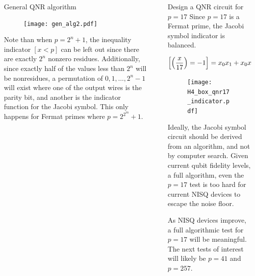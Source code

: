 \documentclass[final]{beamer}
\newlength{\sepwidth}
\newlength{\colwidth}
\newcommand{\separatorcolumn}{\begin{column}{\sepwidth}\end{column}}
\begin{document}
\begin{frame}[t]
\begin{columns}[t]
\begin{column}{\colwidth}
\begin{block}{General QNR algorithm}
    \begin{center}
    \begin{figure}
      \texttt{[image: gen\_alg2.pdf]}
    \end{figure}
    \end{center}

    Note than when $p=2^n+1$, the inequality indicator $[x<p]$ can be left out since there are exactly $2^n$ nonzero residues.
    Additionally, since exactly half of the values less than $2^n$ will be nonresidues, a permutation of $0,1,\ldots ,2^{n}-1$ will exist where one of the output wires is the parity bit, and another is the indicator function for the Jacobi symbol.
  This only happens for Fermat primes where $p=2^{2^m}+1$.
  \end{block}


\end{column}

\separatorcolumn

\begin{column}{\colwidth}

  \begin{block}{Design a QNR circuit for $p=17$}
    Since $p=17$ is a Fermat prime, the Jacobi symbol indicator is balanced.

 $$\left[\left( \displaystyle\frac{x}{17} \right)=-1\right]=x_0x_1+x_0x_2+x_1x_2+x_1x_3+x_2x_3+x_0x_1x_3$$

 \begin{center}
    \begin{figure}
      \texttt{[image: H4\_box\_qnr17\_indicator.pdf]}
    \end{figure}
 \end{center}

    Ideally, the Jacobi symbol circuit should be derived from an algorithm, and not by computer search.
    Given current qubit fidelity levels, a full algorithm, even the $p=17$ test is too hard for current NISQ devices to escape the noise floor.

    As NISQ devices improve, a full algorithmic test for $p=17$ will be meaningful.
    The next tests of interest will likely be $p=41$ and $p=257$.


\end{block}
\end{column}
\end{columns}
\end{frame}
\end{document}
